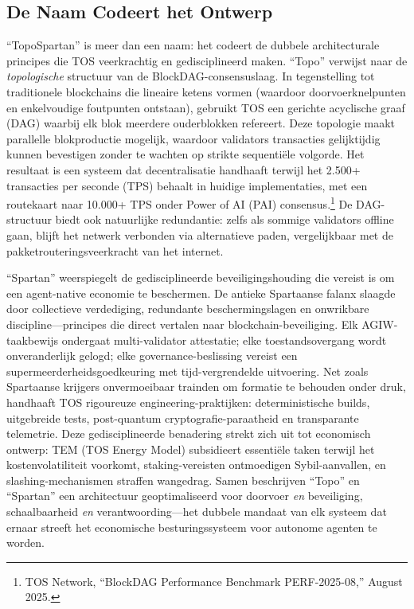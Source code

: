 \documentclass[11pt]{article}
\begin{document}
\subsection{De Naam Codeert het Ontwerp}
``TopoSpartan'' is meer dan een naam: het codeert de dubbele architecturale principes die TOS veerkrachtig en gedisciplineerd maken. ``Topo'' verwijst naar de \emph{topologische} structuur van de BlockDAG-consensuslaag. In tegenstelling tot traditionele blockchains die lineaire ketens vormen (waardoor doorvoerknelpunten en enkelvoudige foutpunten ontstaan), gebruikt TOS een gerichte acyclische graaf (DAG) waarbij elk blok meerdere ouderblokken refereert. Deze topologie maakt parallelle blokproductie mogelijk, waardoor validators transacties gelijktijdig kunnen bevestigen zonder te wachten op strikte sequentiële volgorde. Het resultaat is een systeem dat decentralisatie handhaaft terwijl het 2.500+ transacties per seconde (TPS) behaalt in huidige implementaties, met een routekaart naar 10.000+ TPS onder Power of AI (PAI) consensus.\footnote{TOS Network, ``BlockDAG Performance Benchmark PERF-2025-08,'' August 2025.} De DAG-structuur biedt ook natuurlijke redundantie: zelfs als sommige validators offline gaan, blijft het netwerk verbonden via alternatieve paden, vergelijkbaar met de pakketrouteringsveerkracht van het internet.

``Spartan'' weerspiegelt de gedisciplineerde beveiligingshouding die vereist is om een agent-native economie te beschermen. De antieke Spartaanse falanx slaagde door collectieve verdediging, redundante beschermingslagen en onwrikbare discipline---principes die direct vertalen naar blockchain-beveiliging. Elk AGIW-taakbewijs ondergaat multi-validator attestatie; elke toestandsovergang wordt onveranderlijk gelogd; elke governance-beslissing vereist een supermeerderheidsgoedkeuring met tijd-vergrendelde uitvoering. Net zoals Spartaanse krijgers onvermoeibaar trainden om formatie te behouden onder druk, handhaaft TOS rigoureuze engineering-praktijken: deterministische builds, uitgebreide tests, post-quantum cryptografie-paraatheid en transparante telemetrie. Deze gedisciplineerde benadering strekt zich uit tot economisch ontwerp: TEM (TOS Energy Model) subsidieert essentiële taken terwijl het kostenvolatiliteit voorkomt, staking-vereisten ontmoedigen Sybil-aanvallen, en slashing-mechanismen straffen wangedrag. Samen beschrijven ``Topo'' en ``Spartan'' een architectuur geoptimaliseerd voor doorvoer \emph{en} beveiliging, schaalbaarheid \emph{en} verantwoording---het dubbele mandaat van elk systeem dat ernaar streeft het economische besturingssysteem voor autonome agenten te worden.
\end{document}
